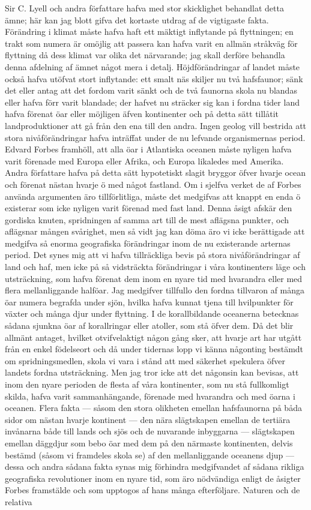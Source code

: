 Sir C. Lyell och andra författare hafva med stor skicklighet behandlat detta ämne; här kan jag blott gifva det kortaste utdrag af de vigtigaste fakta. Förändring i klimat måste hafva haft ett mäktigt inflytande på flyttningen; en trakt som numera är omöjlig att passera kan hafva varit en allmän stråkväg för flyttning då dess klimat var olika det närvarande; jag skall derföre behandla denna afdelning af ämnet något mera i detalj. Höjdförändringar af landet måste också hafva utöfvat stort inflytande: ett smalt näs skiljer nu två hafsfaunor; sänk det eller antag att det fordom varit sänkt och de två faunorna skola nu blandas eller hafva förr varit blandade; der hafvet nu sträcker sig kan i fordna tider land hafva förenat öar eller möjligen äfven kontinenter och på detta sätt tillåtit landproduktioner att gå från den ena till den andra. Ingen geolog vill bestrida att stora nivåförändringar hafva inträffat under de nu lefvande organismernas period. Edvard Forbes framhöll, att alla öar i Atlantiska oceanen måste nyligen hafva varit förenade med Europa eller Afrika, och Europa likaledes med Amerika. Andra författare hafva på detta sätt hypotetiskt slagit bryggor öfver hvarje ocean och förenat nästan hvarje ö med något fastland. Om i sjelfva verket de af Forbes använda argumenten äro tillförlitliga, måste det medgifvas att knappt en enda ö existerar som icke nyligen varit förenad med fast land. Denna åsigt afskär den gordiska knuten, spridningen af samma art till de mest aflägsna punkter, och aflägsnar mången svårighet, men så vidt jag kan döma äro vi icke berättigade att medgifva så enorma geografiska förändringar inom de nu existerande arternas period. Det synes mig att vi hafva tillräckliga bevis på stora nivåförändringar af land och haf, men icke på så vidsträckta förändringar i våra kontinenters läge och utsträckning, som hafva förenat dem inom en nyare tid med hvarandra eller med flera mellanliggande halföar. Jag medgifver tillfullo den fordna tillvaron af många öar numera begrafda under sjön, hvilka hafva kunnat tjena till hvilpunkter för växter och många djur under flyttning. I de korallbildande oceanerna betecknas sådana sjunkna öar af korallringar eller atoller, som stå öfver dem. Då det blir allmänt antaget, hvilket otvifvelaktigt någon gång sker, att hvarje art har utgått från en enkel födelseort och då under tidernas lopp vi känna någonting bestämdt om spridningsmedlen, skola vi vara i stånd att med säkerhet spekulera öfver landets fordna utsträckning. Men jag tror icke att det någonsin kan bevisas, att inom den nyare perioden de flesta af våra kontinenter, som nu stå fullkomligt skilda, hafva varit sammanhängande, förenade med hvarandra och med öarna i oceanen. Flera fakta — såsom den stora olikheten emellan hafsfaunorna på båda sidor om nästan hvarje kontinent — den nära slägtskapen emellan de tertiära invånarna både till lands och sjös och de nuvarande inbyggarna — slägtskapen emellan däggdjur som bebo öar med dem på den närmaste kontinenten, delvis bestämd (såsom vi framdeles skola se) af den mellanliggande oceanens djup — dessa och andra sådana fakta synas mig förhindra medgifvandet af sådana rikliga geografiska revolutioner inom en nyare tid, som äro nödvändiga enligt de åsigter Forbes framstälde och som upptogos af hans många efterföljare. Naturen och de relativa 
